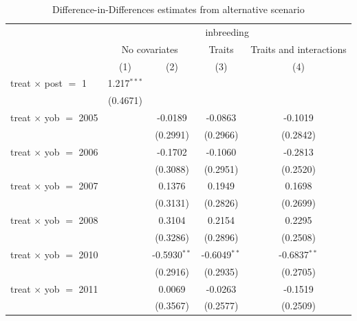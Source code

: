 
\begin{table}[htbp]
   \caption{\label{tab:table4} Difference-in-Differences estimates from alternative scenario}
   \bigskip
   \centering
   \begin{tabular}{lcccc}
      \toprule
       & \multicolumn{4}{c}{inbreeding}\\
       & \multicolumn{2}{c}{No covariates} & Traits & Traits and interactions \\ 
                                     & (1)           & (2)            & (3)            & (4)\\  
      \midrule 
      treat $\times$ post $=$ 1      & 1.217$^{***}$ &                &                &   \\   
                                     & (0.4671)      &                &                &   \\   
      treat $\times$ yob $=$ 2005    &               & -0.0189        & -0.0863        & -0.1019\\   
                                     &               & (0.2991)       & (0.2966)       & (0.2842)\\   
      treat $\times$ yob $=$ 2006    &               & -0.1702        & -0.1060        & -0.2813\\   
                                     &               & (0.3088)       & (0.2951)       & (0.2520)\\   
      treat $\times$ yob $=$ 2007    &               & 0.1376         & 0.1949         & 0.1698\\   
                                     &               & (0.3131)       & (0.2826)       & (0.2699)\\   
      treat $\times$ yob $=$ 2008    &               & 0.3104         & 0.2154         & 0.2295\\   
                                     &               & (0.3286)       & (0.2896)       & (0.2508)\\   
      treat $\times$ yob $=$ 2010    &               & -0.5930$^{**}$ & -0.6049$^{**}$ & -0.6837$^{**}$\\   
                                     &               & (0.2916)       & (0.2935)       & (0.2705)\\   
      treat $\times$ yob $=$ 2011    &               & 0.0069         & -0.0263        & -0.1519\\   
                                     &               & (0.3567)       & (0.2577)       & (0.2509)\\   

\end{tabular}
\end{table}
